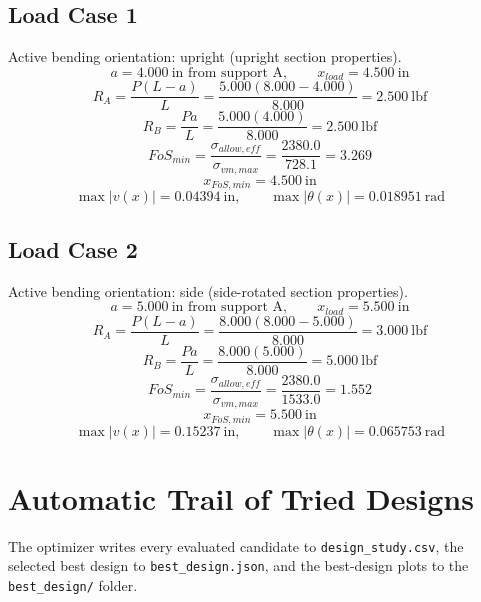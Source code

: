 \documentclass[11pt]{article}
\begin{document}
\subsection*{Load Case 1}
Active bending orientation: upright (upright section properties).
\[a = 4.000\ \mathrm{in} \text{ from support A}, \qquad x_{load} = 4.500\ \mathrm{in}\]
\[R_A = \frac{P(L-a)}{L} = \frac{5.000(8.000-4.000)}{8.000} = 2.500\ \mathrm{lbf}\]
\[R_B = \frac{Pa}{L} = \frac{5.000(4.000)}{8.000} = 2.500\ \mathrm{lbf}\]
\[FoS_{min} = \frac{\sigma_{allow,eff}}{\sigma_{vm,max}} = \frac{2380.0}{728.1} = 3.269\]
\[x_{FoS,min} = 4.500\ \mathrm{in}\]
\[\max |v(x)| = 0.04394\ \mathrm{in}, \qquad \max |\theta(x)| = 0.018951\ \mathrm{rad}\]
\subsection*{Load Case 2}
Active bending orientation: side (side-rotated section properties).
\[a = 5.000\ \mathrm{in} \text{ from support A}, \qquad x_{load} = 5.500\ \mathrm{in}\]
\[R_A = \frac{P(L-a)}{L} = \frac{8.000(8.000-5.000)}{8.000} = 3.000\ \mathrm{lbf}\]
\[R_B = \frac{Pa}{L} = \frac{8.000(5.000)}{8.000} = 5.000\ \mathrm{lbf}\]
\[FoS_{min} = \frac{\sigma_{allow,eff}}{\sigma_{vm,max}} = \frac{2380.0}{1533.0} = 1.552\]
\[x_{FoS,min} = 5.500\ \mathrm{in}\]
\[\max |v(x)| = 0.15237\ \mathrm{in}, \qquad \max |\theta(x)| = 0.065753\ \mathrm{rad}\]

\section*{Automatic Trail of Tried Designs}
The optimizer writes every evaluated candidate to \texttt{design\_study.csv}, the selected best design to \texttt{best\_design.json}, and the best-design plots to the \texttt{best\_design/} folder.
\end{document}

